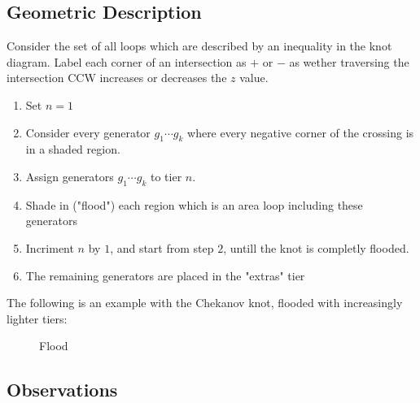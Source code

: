 \documentclass[11pt]{amsart}
\begin{document}
\subsection{Geometric Description}

Consider the set of all loops which are described by an inequality in the knot diagram. Label each corner of an intersection as $+$ or $-$ as wether traversing the intersection CCW increases or decreases the $z$ value.


\begin{enumerate}
    \item Set $n = 1$
    \item Consider every generator $g_1 \cdots g_k$ where every negative corner of the crossing is in a shaded region. 
    \item Assign generators $g_1 \cdots g_k$ to tier $n$.
    \item Shade in ("flood") each region which is an area loop including these generators
    \item Incriment $n$ by $1$, and start from step $2$, untill the knot is completly flooded.
    \item The remaining generators are placed in the "extras" tier

\end{enumerate}

The following is an example with the Chekanov knot, flooded with increasingly lighter tiers:


\begin{figure}[htbp]
  \centering
  
  \caption{Flood}
\end{figure}


\subsection{Observations}
\end{document}
